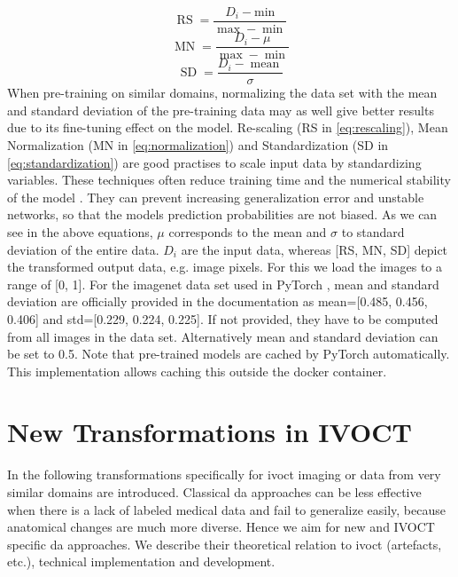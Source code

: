 \begin{equation}
    \operatorname{RS} = \frac{D_i - \text{min}}{\operatorname{max} - \operatorname{min}}
    \label{eq:rescaling}
\end{equation}
\begin{equation}
    \operatorname{MN} = \frac{D_i - \mu}{\operatorname{max} - \operatorname{min}}
    \label{eq:normalization}
\end{equation}
\begin{equation}
    \operatorname{SD} = \frac{D_i - \operatorname{mean}}{\sigma}
    \label{eq:standardization}
\end{equation}
When pre-training on similar domains, normalizing the data set with the mean and standard deviation of the pre-training data may as well give better results due to its fine-tuning effect on the model. Re-scaling (RS in \cref{eq:rescaling}), Mean Normalization (MN in \cref{eq:normalization}) and Standardization (SD in \cref{eq:standardization}) are good practises to scale input data by standardizing variables. These techniques often reduce training time and the numerical stability of the model \cite{Shanker.1996}. They can prevent increasing generalization error and unstable networks, so that the models prediction probabilities are not biased. As we can see in the above equations, \( \mu \) corresponds to the mean and \( \sigma \) to standard deviation of the entire data. \( D_i \) are the input data, whereas [RS, MN, SD] depict the transformed output data, e.g. image pixels. For this we load the images to a range of [0, 1]. For the \gls{imagenet} data set used in PyTorch \cite{PyTorchContributors.2019}, mean and standard deviation are officially provided in the documentation as mean=[0.485, 0.456, 0.406] and std=[0.229, 0.224, 0.225]. If not provided, they have to be computed from all images in the data set. Alternatively mean and standard deviation can be set to 0.5. Note that pre-trained models are cached by PyTorch automatically. This implementation allows caching this outside the docker container.

\section{New Transformations in IVOCT}

In the following transformations specifically for \acrshort{ivoct} imaging or data from very similar domains are introduced. Classical \acrshort{da} approaches can be less effective when there is a lack of labeled medical data and fail to generalize easily, because anatomical changes are much more diverse. \cite{BenCohen.2018} Hence we aim for new and IVOCT specific \acrshort{da} approaches. We describe their theoretical relation to \acrshort{ivoct} (artefacts, etc.), technical implementation and development.

